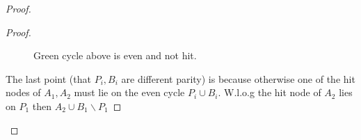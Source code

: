 \documentclass[letterpaper,11pt]{article}
\newcommand{\0}{\mathbb{0}}
\newcommand{\1}{\mathbb{1}}
\begin{document}
\begin{proof}
\begin{proof}
\begin{figure}[h]
    \caption{Green cycle above is even and not hit.}
    \label{doublecrosscontradicrtion2}
\end{figure}

The last point (that $P_i , B_i$ are different parity) is because otherwise one of the hit nodes of $A_1, A_2$ must lie on the even cycle $P_i \cup B_i$.  W.l.o.g  the hit node of $A_2$ lies on $P_1$ then $A_2 \cup B_1 \backslash P_1$

\end{proof}


\end{proof}
\end{document}
